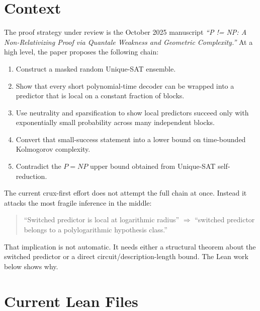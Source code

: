 \documentclass[11pt]{article}
\theoremstyle{remark}
\begin{document}
\begin{abstract}
These results do not by themselves disprove the whole paper.  They do isolate an essential gap:
the switching/locality step must be strengthened by a real theorem showing that the specific
switched predictors lie in an exceptionally small subclass, not merely in the class of all local
functions.
\end{abstract}

\tableofcontents

\section{Context}

The proof strategy under review is the October 2025 manuscript
\emph{``P != NP: A Non-Relativizing Proof via Quantale Weakness and Geometric Complexity.''}
At a high level, the paper proposes the following chain:
\begin{enumerate}[leftmargin=1.5em]
  \item Construct a masked random Unique-SAT ensemble.
  \item Show that every short polynomial-time decoder can be wrapped into a predictor that is
  local on a constant fraction of blocks.
  \item Use neutrality and sparsification to show local predictors succeed only with exponentially
  small probability across many independent blocks.
  \item Convert that small-success statement into a lower bound on time-bounded Kolmogorov
  complexity.
  \item Contradict the $P=NP$ upper bound obtained from Unique-SAT self-reduction.
\end{enumerate}

The current crux-first effort does not attempt the full chain at once.  Instead it attacks the
most fragile inference in the middle:

\begin{quote}
``Switched predictor is local at logarithmic radius'' $\Longrightarrow$
``switched predictor belongs to a polylogarithmic hypothesis class.''
\end{quote}

That implication is not automatic.  It needs either a structural theorem about the switched
predictor or a direct circuit/description-length bound.  The Lean work below shows why.

\section{Current Lean Files}
\end{document}
